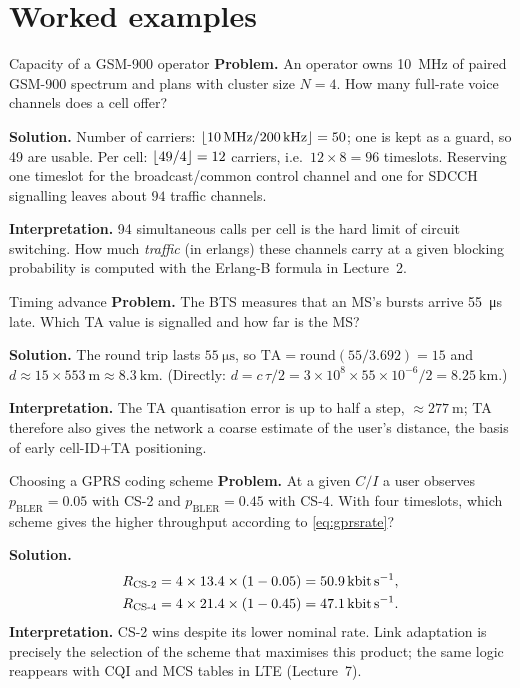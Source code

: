 \documentclass[11pt,a4paper]{article}
\begin{document}
\section{Worked examples}\label{sec:examples}

\begin{examplebox}{Capacity of a GSM-900 operator}\label{ex:capacity}
\textbf{Problem.} An operator owns \qty{10}{\mega\hertz} of paired GSM-900 spectrum and
plans with cluster size $N=4$. How many full-rate voice channels does a cell offer?

\textbf{Solution.} Number of carriers: $\left\lfloor \qty{10}{\mega\hertz}/\qty{200}{\kilo\hertz}\right\rfloor = 50$;
one is kept as a guard, so 49 are usable. Per cell: $\left\lfloor 49/4\right\rfloor = 12$ carriers,
i.e.\ $12\times 8 = 96$ timeslots. Reserving one timeslot for the broadcast/common
control channel and one for SDCCH signalling leaves about $94$ traffic channels.

\textbf{Interpretation.} 94 simultaneous calls per cell is the hard limit of circuit
switching. How much \emph{traffic} (in erlangs) these channels carry at a given
blocking probability is computed with the Erlang-B formula in Lecture~2.
\end{examplebox}

\begin{examplebox}{Timing advance}\label{ex:ta}
\textbf{Problem.} The BTS measures that an MS's bursts arrive \qty{55}{\micro\second}
late. Which TA value is signalled and how far is the MS?

\textbf{Solution.} The round trip lasts $\qty{55}{\micro\second}$, so
$\mathrm{TA} = \mathrm{round}(55/3.692) = 15$ and
$d \approx 15\times\qty{553}{\metre} \approx \qty{8.3}{\kilo\metre}$.
(Directly: $d = c\,\tau/2 = 3\times10^8\times55\times10^{-6}/2 = \qty{8.25}{\kilo\metre}$.)

\textbf{Interpretation.} The TA quantisation error is up to half a step, $\approx\qty{277}{\metre}$;
TA therefore also gives the network a coarse estimate of the user's distance, the
basis of early cell-ID+TA positioning.
\end{examplebox}

\begin{examplebox}{Choosing a GPRS coding scheme}\label{ex:cs}
\textbf{Problem.} At a given $C/I$ a user observes $p_{\mathrm{BLER}} = 0.05$ with CS-2
and $p_{\mathrm{BLER}} = 0.45$ with CS-4. With four timeslots, which scheme gives the
higher throughput according to \cref{eq:gprsrate}?

\textbf{Solution.}
\begin{align*}
  R_{\mathrm{CS\text{-}2}} &= 4\times13.4\times(1-0.05) = \qty{50.9}{\kilo\bit\per\second},\\
  R_{\mathrm{CS\text{-}4}} &= 4\times21.4\times(1-0.45) = \qty{47.1}{\kilo\bit\per\second}.
\end{align*}
\textbf{Interpretation.} CS-2 wins despite its lower nominal rate. Link adaptation is
precisely the selection of the scheme that maximises this product; the same logic
reappears with CQI and MCS tables in LTE (Lecture~7).
\end{examplebox}
\end{document}
